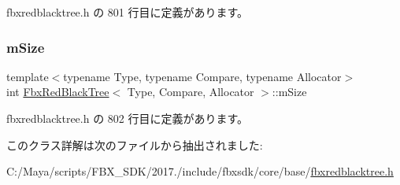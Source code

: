  fbxredblacktree.\+h の 801 行目に定義があります。

\mbox{\label{class_fbx_red_black_tree_a45b29bfeaffd897c186440fef29b6dfe}} 
\subsubsection{\texorpdfstring{m\+Size}{mSize}}
{\footnotesize\ttfamily template$<$typename Type, typename Compare, typename Allocator$>$ \\
int \hyperlink{class_fbx_red_black_tree}{Fbx\+Red\+Black\+Tree}$<$ Type, Compare, Allocator $>$\+::m\+Size\hspace{0.3cm}{\ttfamily [protected]}}



 fbxredblacktree.\+h の 802 行目に定義があります。



このクラス詳解は次のファイルから抽出されました\+:\begin{DoxyCompactItemize}
\item 
C\+:/\+Maya/scripts/\+F\+B\+X\+\_\+\+S\+D\+K/2017./include/fbxsdk/core/base/\hyperlink{fbxredblacktree_8h}{fbxredblacktree.\+h}\end{DoxyCompactItemize}
